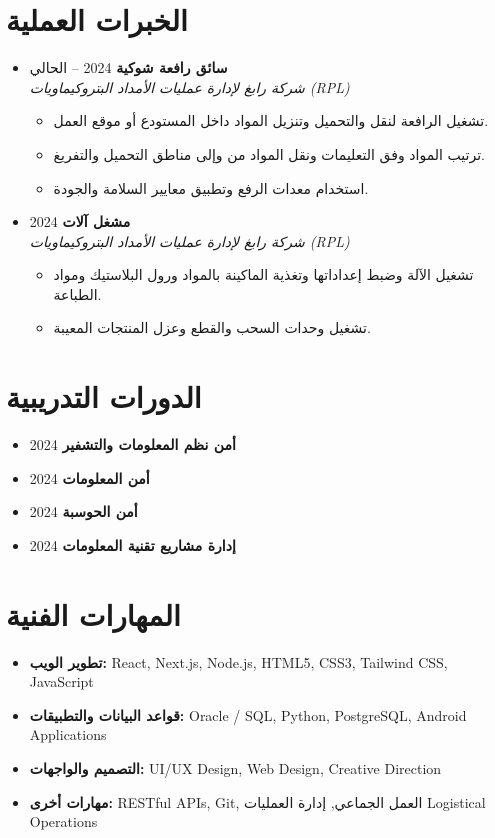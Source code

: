 \documentclass[10pt,a4paper]{article}
\begin{document}
\section*{الخبرات العملية}
\begin{itemize}[leftmargin=*]
    \item \textbf{سائق رافعة شوكية} \hfill 2024 -- الحالي \\
    \textit{شركة رابغ لإدارة عمليات الأمداد البتروكيماويات (RPL)}
    \begin{itemize}
        \item تشغيل الرافعة لنقل والتحميل وتنزيل المواد داخل المستودع أو موقع العمل.
        \item ترتيب المواد وفق التعليمات ونقل المواد من وإلى مناطق التحميل والتفريغ.
        \item استخدام معدات الرفع وتطبيق معايير السلامة والجودة.
    \end{itemize}

    \item \textbf{مشغل آلات} \hfill 2024 \\
    \textit{شركة رابغ لإدارة عمليات الأمداد البتروكيماويات (RPL)}
    \begin{itemize}
        \item تشغيل الآلة وضبط إعداداتها وتغذية الماكينة بالمواد ورول البلاستيك ومواد الطباعة.
        \item تشغيل وحدات السحب والقطع وعزل المنتجات المعيبة.
    \end{itemize}
\end{itemize}

\section*{الدورات التدريبية}
\begin{itemize}[leftmargin=*]
    \item \textbf{أمن نظم المعلومات والتشفير} \hfill 2024
    \item \textbf{أمن المعلومات} \hfill 2024
    \item \textbf{أمن الحوسبة} \hfill 2024
    \item \textbf{إدارة مشاريع تقنية المعلومات} \hfill 2024
\end{itemize}

\section*{المهارات الفنية}
\begin{itemize}[leftmargin=*]
    \item \textbf{تطوير الويب:} React, Next.js, Node.js, HTML5, CSS3, Tailwind CSS, JavaScript
    \item \textbf{قواعد البيانات والتطبيقات:} Oracle / SQL, Python, PostgreSQL, Android Applications
    \item \textbf{التصميم والواجهات:} UI/UX Design, Web Design, Creative Direction
    \item \textbf{مهارات أخرى:} RESTful APIs, Git, العمل الجماعي, إدارة العمليات Logistical Operations
\end{itemize}
\end{document}
